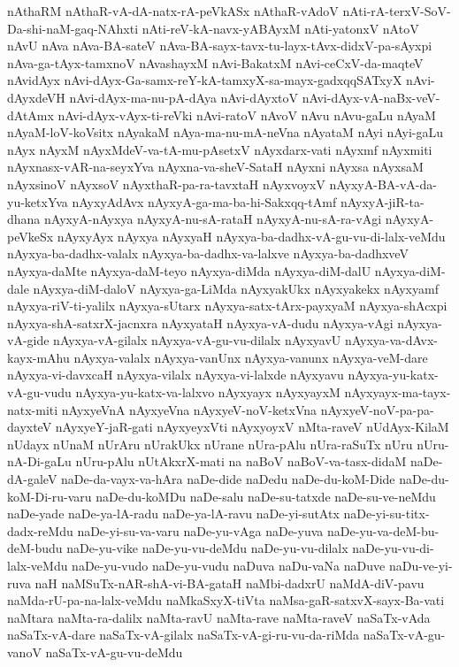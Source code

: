 {nAthaRM
nAthaR-vA-dA-natx-rA-peVkASx
nAthaR-vAdoV
nAti-rA-terxV-SoV-Da-shi-naM-gaq-NAhxti
nAti-reV-kA-navx-yABAyxM
nAti-yatonxV
nAtoV
nAvU
nAva
nAva-BA-sateV
nAva-BA-sayx-tavx-tu-layx-tAvx-didxV-pa-sAyxpi
nAva-ga-tAyx-tamxnoV
nAvashayxM
nAvi-BakatxM
nAvi-ceCxV-da-maqteV
nAvidAyx
nAvi-dAyx-Ga-samx-reY-kA-tamxyX-sa-mayx-gadxqqSATxyX
nAvi-dAyxdeVH
nAvi-dAyx-ma-nu-pA-dAya
nAvi-dAyxtoV
nAvi-dAyx-vA-naBx-veV-dAtAmx
nAvi-dAyx-vAyx-ti-reVki
nAvi-ratoV
nAvoV
nAvu
nAvu-gaLu
nAyaM
nAyaM-loV-koVsitx
nAyakaM
nAya-ma-nu-mA-neVna
nAyataM
nAyi
nAyi-gaLu
nAyx
nAyxM
nAyxMdeV-va-tA-mu-pAsetxV
nAyxdarx-vati
nAyxmf
nAyxmiti
nAyxnasx-vAR-na-seyxYva
nAyxna-va-sheV-SataH
nAyxni
nAyxsa
nAyxsaM
nAyxsinoV
nAyxsoV
nAyxthaR-pa-ra-tavxtaH
nAyxvoyxV
nAyxyA-BA-vA-da-yu-ketxYva
nAyxyAdAvx
nAyxyA-ga-ma-ba-hi-Sakxqq-tAmf
nAyxyA-jiR-ta-dhana
nAyxyA-nAyxya
nAyxyA-nu-sA-rataH
nAyxyA-nu-sA-ra-vAgi
nAyxyA-peVkeSx
nAyxyAyx
nAyxya
nAyxyaH
nAyxya-ba-dadhx-vA-gu-vu-di-lalx-veMdu
nAyxya-ba-dadhx-valalx
nAyxya-ba-dadhx-va-lalxve
nAyxya-ba-dadhxveV
nAyxya-daMte
nAyxya-daM-teyo
nAyxya-diMda
nAyxya-diM-dalU
nAyxya-diM-dale
nAyxya-diM-daloV
nAyxya-ga-LiMda
nAyxyakUkx
nAyxyakekx
nAyxyamf
nAyxya-riV-ti-yalilx
nAyxya-sUtarx
nAyxya-satx-tArx-payxyaM
nAyxya-shAcxpi
nAyxya-shA-satxrX-jacnxra
nAyxyataH
nAyxya-vA-dudu
nAyxya-vAgi
nAyxya-vA-gide
nAyxya-vA-gilalx
nAyxya-vA-gu-vu-dilalx
nAyxyavU
nAyxya-va-dAvx-kayx-mAhu
nAyxya-valalx
nAyxya-vanUnx
nAyxya-vanunx
nAyxya-veM-dare
nAyxya-vi-davxcaH
nAyxya-vilalx
nAyxya-vi-lalxde
nAyxyavu
nAyxya-yu-katx-vA-gu-vudu
nAyxya-yu-katx-va-lalxvo
nAyxyayx
nAyxyayxM
nAyxyayx-ma-tayx-natx-miti
nAyxyeVnA
nAyxyeVna
nAyxyeV-noV-ketxVna
nAyxyeV-noV-pa-pa-dayxteV
nAyxyeY-jaR-gati
nAyxyeyxVti
nAyxyoyxV
nMta-raveV
nUdAyx-KilaM
nUdayx
nUnaM
nUrAru
nUrakUkx
nUrane
nUra-pAlu
nUra-raSuTx
nUru
nUru-nA-Di-gaLu
nUru-pAlu
nUtAkxrX-mati
na
naBoV
naBoV-va-tasx-didaM
naDe-dA-galeV
naDe-da-vayx-va-hAra
naDe-dide
naDedu
naDe-du-koM-Dide
naDe-du-koM-Di-ru-varu
naDe-du-koMDu
naDe-salu
naDe-su-tatxde
naDe-su-ve-neMdu
naDe-yade
naDe-ya-lA-radu
naDe-ya-lA-ravu
naDe-yi-sutAtx
naDe-yi-su-titx-dadx-reMdu
naDe-yi-su-va-varu
naDe-yu-vAga
naDe-yuva
naDe-yu-va-deM-bu-deM-budu
naDe-yu-vike
naDe-yu-vu-deMdu
naDe-yu-vu-dilalx
naDe-yu-vu-di-lalx-veMdu
naDe-yu-vudo
naDe-yu-vudu
naDuva
naDu-vaNa
naDuve
naDu-ve-yi-ruva
naH
naMSuTx-nAR-shA-vi-BA-gataH
naMbi-dadxrU
naMdA-diV-pavu
naMda-rU-pa-na-lalx-veMdu
naMkaSxyX-tiVta
naMsa-gaR-satxvX-sayx-Ba-vati
naMtara
naMta-ra-dalilx
naMta-ravU
naMta-rave
naMta-raveV
naSaTx-vAda
naSaTx-vA-dare
naSaTx-vA-gilalx
naSaTx-vA-gi-ru-vu-da-riMda
naSaTx-vA-gu-vanoV
naSaTx-vA-gu-vu-deMdu
}
